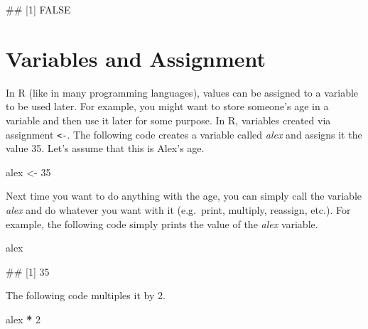 \documentclass[
]{book}
\newenvironment{Shaded}{\begin{snugshade}}{\end{snugshade}}
\newcommand{\DecValTok}[1]{\textcolor[rgb]{0.00,0.00,0.81}{#1}}
\newcommand{\NormalTok}[1]{#1}
\newcommand{\OtherTok}[1]{\textcolor[rgb]{0.56,0.35,0.01}{#1}}
\newcommand{\SpecialCharTok}[1]{\textcolor[rgb]{0.81,0.36,0.00}{\textbf{#1}}}
\begin{document}
\begin{Shaded}
\begin{Highlighting}[]
\NormalTok{\#\# [1] FALSE}
\end{Highlighting}
\end{Shaded}

\hypertarget{variables-and-assignment}{%
\section{Variables and Assignment}\label{variables-and-assignment}}

In R (like in many programming languages), values can be assigned to a variable to be used later. For example, you might want to store someone's age in a variable and then use it later for some purpose. In R, variables created via assignment \texttt{\textless{}-}. The following code creates a variable called \emph{alex} and assigns it the value 35. Let's assume that this is Alex's age.

\begin{Shaded}
\begin{Highlighting}[]
\NormalTok{alex }\OtherTok{\textless{}{-}} \DecValTok{35}
\end{Highlighting}
\end{Shaded}

Next time you want to do anything with the age, you can simply call the variable \emph{alex} and do whatever you want with it (e.g.~print, multiply, reassign, etc.). For example, the following code simply prints the value of the \emph{alex} variable.

\begin{Shaded}
\begin{Highlighting}[]
\NormalTok{alex}
\end{Highlighting}
\end{Shaded}

\begin{Shaded}
\begin{Highlighting}[]
\NormalTok{\#\# [1] 35}
\end{Highlighting}
\end{Shaded}

The following code multiples it by 2.

\begin{Shaded}
\begin{Highlighting}[]
\NormalTok{alex }\SpecialCharTok{*} \DecValTok{2}
\end{Highlighting}
\end{Shaded}
\end{document}
